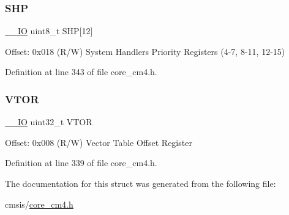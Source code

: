 \mbox{\label{struct_s_c_b___type_a17dc9f83c53cbf7fa249e79a2d2a43f8}} 
\subsubsection{\texorpdfstring{S\+HP}{SHP}}
{\footnotesize\ttfamily \hyperlink{group___c_m_s_i_s__core__definitions_gaec43007d9998a0a0e01faede4133d6be}{\+\_\+\+\_\+\+IO} uint8\+\_\+t S\+HP\mbox{[}12\mbox{]}}

Offset\+: 0x018 (R/W) System Handlers Priority Registers (4-\/7, 8-\/11, 12-\/15) 

Definition at line 343 of file core\+\_\+cm4.\+h.

\mbox{\label{struct_s_c_b___type_aaf388a921a016cae590cfcf1e43b1cdf}} 
\subsubsection{\texorpdfstring{V\+T\+OR}{VTOR}}
{\footnotesize\ttfamily \hyperlink{group___c_m_s_i_s__core__definitions_gaec43007d9998a0a0e01faede4133d6be}{\+\_\+\+\_\+\+IO} uint32\+\_\+t V\+T\+OR}

Offset\+: 0x008 (R/W) Vector Table Offset Register 

Definition at line 339 of file core\+\_\+cm4.\+h.



The documentation for this struct was generated from the following file\+:\begin{DoxyCompactItemize}
\item 
cmsis/\hyperlink{core__cm4_8h}{core\+\_\+cm4.\+h}\end{DoxyCompactItemize}
